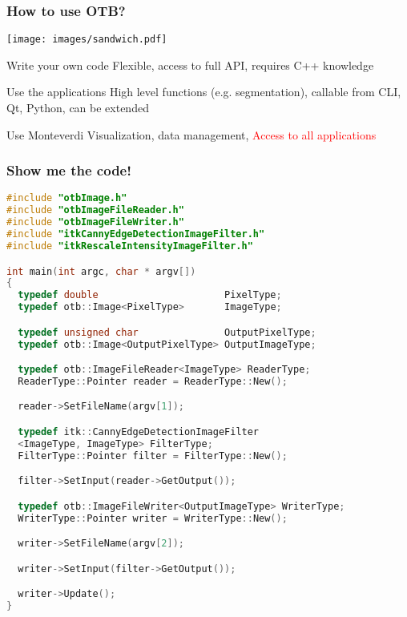 \documentclass[8pt]{beamer}
\begin{document}
\begin{frame}
\frametitle{How to use OTB?}
\vspace{-0.5cm}
\begin{center}
\texttt{[image: images/sandwich.pdf]}
\end{center}
\vspace{-0.5cm}
\begin{block}{Write your own code}
 Flexible, access to full API, requires C++ knowledge
\end{block}
\begin{block}{Use the applications}
 High level functions (e.g. segmentation), callable from CLI, Qt, Python, can be extended
\end{block}
\begin{block}{Use Monteverdi}
Visualization, data management, \textcolor{red}{Access to all applications}
\end{block}
\end{frame}

\begin{frame}[fragile]
\frametitle{Show me the code!}
\begin{lstlisting}[language=c++,breaklines=true,breakatwhitespace=true,frame = tb,framerule = 0.25pt,fontadjust,backgroundcolor={\color{listlightgray}},basicstyle = {\ttfamily\tiny},keywordstyle = {\ttfamily\color{listkeyword}\textbf},identifierstyle = {\ttfamily},commentstyle = {\ttfamily\color{listcomment}\textit},stringstyle = {\ttfamily},showstringspaces = false,showtabs = false,numbers = none,numbersep = 2pt, numberstyle={\ttfamily\color{listnumbers}},tabsize = 2]
#include "otbImage.h"
#include "otbImageFileReader.h"
#include "otbImageFileWriter.h"
#include "itkCannyEdgeDetectionImageFilter.h"
#include "itkRescaleIntensityImageFilter.h"

int main(int argc, char * argv[])
{
  typedef double                      PixelType;
  typedef otb::Image<PixelType>       ImageType;

  typedef unsigned char               OutputPixelType;
  typedef otb::Image<OutputPixelType> OutputImageType;

  typedef otb::ImageFileReader<ImageType> ReaderType;
  ReaderType::Pointer reader = ReaderType::New();

  reader->SetFileName(argv[1]);

  typedef itk::CannyEdgeDetectionImageFilter
  <ImageType, ImageType> FilterType;
  FilterType::Pointer filter = FilterType::New();

  filter->SetInput(reader->GetOutput());

  typedef otb::ImageFileWriter<OutputImageType> WriterType;
  WriterType::Pointer writer = WriterType::New();

  writer->SetFileName(argv[2]);

  writer->SetInput(filter->GetOutput());

  writer->Update();
}
\end{lstlisting}
\end{frame}
\end{document}
